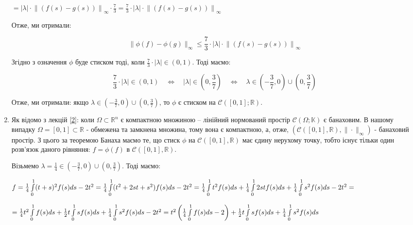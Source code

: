\documentclass[a5paper, 20pt, titlepage]{article}
\begin{document}
\begin{enumerate}
\vspace{3mm}
\hspace{23mm}
$= |\lambda| \cdot \left\| \left(f(s) - g(s) \right) \right\|_\infty \cdot \frac{7}{3} = \frac{7}{3} \cdot |\lambda| \cdot \left\| \left(f(s) - g(s) \right) \right\|_\infty$

\newpage{}
Отже, ми отримали:

\vspace{-4mm}
$$ \| \phi(f) - \phi(g)\|_\infty \leqslant  \frac{7}{3} \cdot |\lambda| \cdot \left\| \left(f(s) - g(s) \right) \right\|_\infty$$

Згідно з означення $\phi$ буде стиском тоді, коли $ \frac{7}{3} \cdot |\lambda| \in (0, 1)$. Тоді маємо:

\vspace{-3mm}
$$\frac{7}{3} \cdot |\lambda| \in (0, 1) \quad \Leftrightarrow \quad |\lambda| \in (0, \frac{3}{7} ) \quad \Leftrightarrow \quad
\lambda \in (-\frac{3}{7}, 0) \cup (0, \frac{3}{7}) $$

Отже, ми отримали: якщо $\lambda \in (-\frac{3}{7}, 0) \cup (0, \frac{3}{7})$, то $\phi$ є стиском на $\mathcal{C} \left( [0, 1]; \mathbb{R} \right)$.

\item Як відомо з лекцій \hyperlink{1}{[2]}: коли $\Omega \subset \mathbb{R}^n$ є компактною множиною -- лінійний нормований простір $\mathcal{C} \left( \Omega; \mathbb{K} \right)$ є банаховим. В нашому випадку $\Omega = [0, 1] \subset \mathbb{R}$ - обмежена та замкнена множина, тому вона є компактною, а, отже, $\left( \mathcal{C} \left( [0, 1], \mathbb{R} \right), \| \cdot \|_\infty \right)$ - банаховий простір. З цього за теоремою Банаха маємо те, що стиск $\phi$ на $\mathcal{C} \left( [0, 1], \mathbb{R} \right)$ має єдину нерухому точку, тобто існує тільки один розв'язок даного рівняння: $f = \phi(f)$ в $\mathcal{C} \left( [0, 1], \mathbb{R} \right)$.

Візьмемо $\lambda = \frac{1}{4} \in  (-\frac{3}{7}, 0) \cup (0, \frac{3}{7})$. Тоді маємо:

\vspace{3mm}
$ f =  \frac{1}{4} \int \limits_{0}^{1} (t + s)^2 f(s) ds - 2t^2 = \frac{1}{4} \int \limits_{0}^{1} (t^2 + 2st + s^2) f(s) ds - 2t^2 = \frac{1}{4} \int \limits_{0}^{1} t^2 f(s) ds + \frac{1}{4} \int \limits_{0}^{1} 2stf(s) ds + \frac{1}{4} \int \limits_{0}^{1} s^2 f(s) ds - \nolinebreak 2t^2 =$

\vspace{3mm}
\hspace{2mm} 
$=  \frac{1}{4} t^2 \int \limits_{0}^{1} f(s) ds + \frac{1}{2}t \int \limits_{0}^{1} sf(s) ds + \frac{1}{4} \int \limits_{0}^{1} s^2 f(s) ds - \nolinebreak 2t^2 =
t^2 \left( \frac{1}{4} \int \limits_{0}^{1} f(s) ds - 2 \right) +  \frac{1}{2}t \int \limits_{0}^{1} sf(s) ds + \frac{1}{4} \int \limits_{0}^{1} s^2 f(s) ds  $


\end{enumerate}
\end{document}
